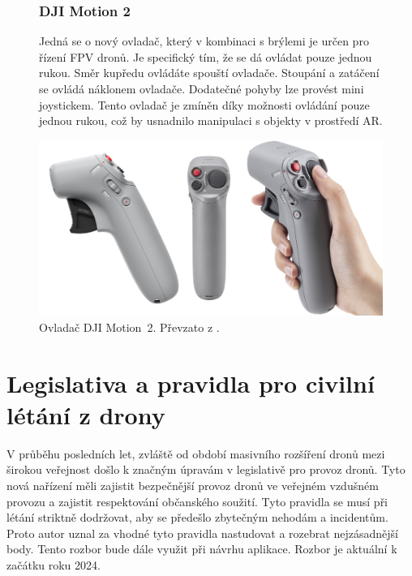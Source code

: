 \begin{figure}[h]
  \begin{minipage}{0.6\textwidth}
  \subsubsection{DJI Motion 2 }
    Jedná se o nový ovladač, který v kombinaci s brýlemi je určen pro řízení FPV dronů. Je specifický tím, že se dá ovládat pouze jednou rukou. Směr kupředu ovládáte spouští ovladače. Stoupání a zatáčení se ovládá náklonem ovladače. Dodatečné pohyby lze provést mini joystickem. Tento ovladač je zmíněn díky možnosti ovládání pouze jednou rukou, což by usnadnilo manipulaci s objekty v prostředí AR. 
  \end{minipage}%
  \hfill
  \begin{minipage}{0.38\textwidth}
    \centering
    \includegraphics[width=\textwidth]{obrazky-figures/drony/djiMotion.png}
    \captionsetup{type=figure} %
    \caption{Ovladač DJI Motion~2. Převzato z \cite{djiMotionPic}.}
    \label{fig:DjiMotion}
  \end{minipage}
\end{figure}
\newpage
\section{Legislativa a pravidla pro civilní létání z drony}
V průběhu posledních let, zvláště od období masivního rozšíření dronů mezi širokou veřejnost došlo k značným úpravám v legislativě pro provoz dronů. Tyto nová nařízení měli zajistit bezpečnější provoz dronů ve veřejném vzdušném provozu a zajistit respektování občanského soužití. Tyto pravidla se musí při létání striktně dodržovat, aby se předešlo zbytečným nehodám a incidentům. Proto autor uznal za vhodné tyto pravidla nastudovat a rozebrat nejzásadnější body. Tento rozbor bude dále využit při návrhu aplikace. Rozbor je aktuální k začátku roku 2024.

